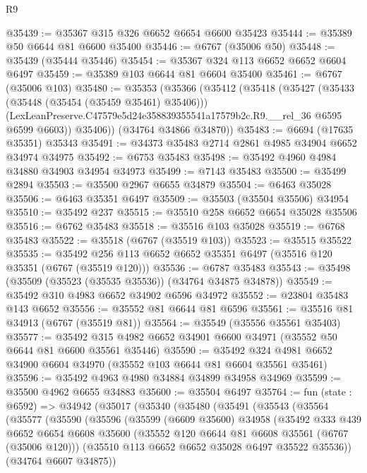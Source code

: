 \begin{lexlean}{R9}
\begin{coremodule}
@35439 := @35367 @315 @326 @6652 @6654 @6600 @35423
@35444 := @35389 @50 @6644 @81 @6600 @35400
@35446 := @6767 (@35006 @50)
@35448 := @35439 (@35444 @35446)
@35454 := @35367 @324 @113 @6652 @6652 @6604 @6497
@35459 := @35389 @103 @6644 @81 @6604 @35400
@35461 := @6767 (@35006 @103)
@35480 := @35353
    (@35366
      (@35412
        (@35418
          (@35427
            (@35433 (@35448 (@35454 (@35459 @35461) @35406)))
            (LexLeanPreserve.C47579e5d24e358839355541a17579b2c.R9.__rel_36 @6595 @6599 @6603))
          @35406))
      (@34764 @34866 @34870))
@35483 := @6694 (@17635 @35351) @35343
@35491 := @34373 @35483 @2714 @2861 @4985 @34904 @6652 @34974 @34975
@35492 := @6753 @35483
@35498 := @35492 @4960 @4984 @34880 @34903 @34954 @34973
@35499 := @7143 @35483
@35500 := @35499 @2894
@35503 := @35500 @2967 @6655 @34879
@35504 := @6463 @35028
@35506 := @6463 @35351 @6497
@35509 := @35503 (@35504 @35506) @34954
@35510 := @35492 @237
@35515 := @35510 @258 @6652 @6654 @35028 @35506
@35516 := @6762 @35483
@35518 := @35516 @103 @35028
@35519 := @6768 @35483
@35522 := @35518 (@6767 (@35519 @103))
@35523 := @35515 @35522
@35535 := @35492 @256 @113 @6652 @6652 @35351 @6497 (@35516 @120 @35351 (@6767 (@35519 @120)))
@35536 := @6787 @35483
@35543 := @35498 (@35509 (@35523 (@35535 @35536)) (@34764 @34875 @34878))
@35549 := @35492 @310 @4983 @6652 @34902 @6596 @34972
@35552 := @23804 @35483 @143 @6652
@35556 := @35552 @81 @6644 @81 @6596
@35561 := @35516 @81 @34913 (@6767 (@35519 @81))
@35564 := @35549 (@35556 @35561 @35403)
@35577 := @35492 @315 @4982 @6652 @34901 @6600 @34971 (@35552 @50 @6644 @81 @6600 @35561 @35446)
@35590 := @35492 @324 @4981 @6652 @34900 @6604 @34970 (@35552 @103 @6644 @81 @6604 @35561 @35461)
@35596 := @35492 @4963 @4980 @34884 @34899 @34958 @34969
@35599 := @35500 @4962 @6655 @34883
@35600 := @35504 @6497
@35764 := fun (state : @6592) =>
  @34942
    (@35017
      (@35340
        (@35480
          (@35491
            (@35543
              (@35564
                (@35577
                  (@35590
                    (@35596
                      (@35599
                        (@6609 @35600)
                        @34958
                        (@35492
                          @333
                          @439
                          @6652
                          @6654
                          @6608
                          @35600
                          (@35552 @120 @6644 @81 @6608 @35561 (@6767 (@35006 @120)))
                          (@35510 @113 @6652 @6652 @35028 @6497 @35522 @35536))
                        (@34764 @6607 @34875))

\end{coremodule}
\end{lexlean}
